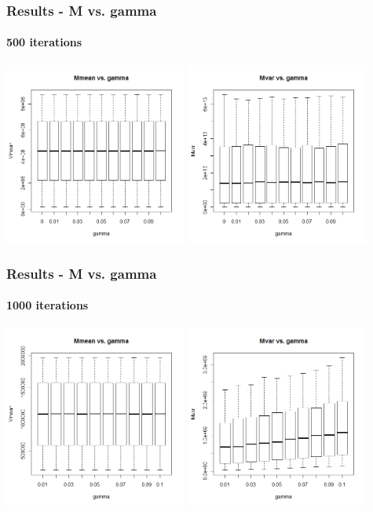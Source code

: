 \begin{frame}
    \frametitle{Results - M vs. gamma }
	\framesubtitle{500 iterations}
\hspace*{-5mm}
\includegraphics[height=6cm]{boxplot500_mmean_gamma}
\includegraphics[height=6cm]{boxplot500_mvar_gamma}
\end{frame}

\begin{frame}
    \frametitle{Results - M vs. gamma }
	\framesubtitle{1000 iterations}
\hspace*{-5mm}
\includegraphics[height=6cm]{boxplot1000_mmean_gamma}
\includegraphics[height=6cm]{boxplot1000_mvar_gamma}
\end{frame}





